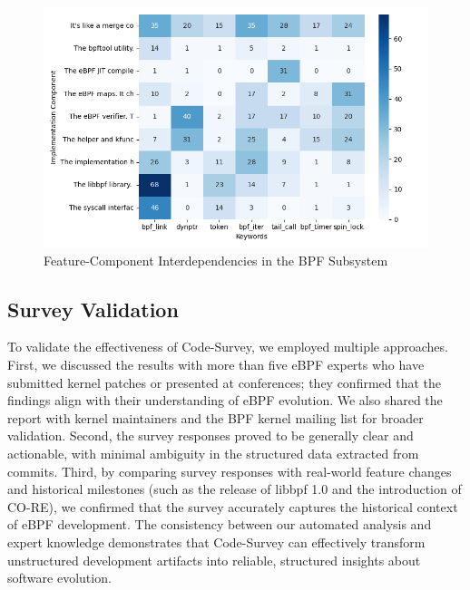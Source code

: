 \begin{figure}[ht]
    \centering
    \includegraphics[width=\linewidth]{feature-analysis/heatmap_bpf_keywords_vs_components.png}
    \caption{Feature-Component Interdependencies in the BPF Subsystem}
    \label{fig:feature_component_heatmap}
\end{figure}


\subsection{Survey Validation}

To validate the effectiveness of Code-Survey, we employed multiple approaches. First, we discussed the results with more than five eBPF experts who have submitted kernel patches or presented at conferences; they confirmed that the findings align with their understanding of eBPF evolution. We also shared the report with kernel maintainers and the BPF kernel mailing list for broader validation. Second, the survey responses proved to be generally clear and actionable, with minimal ambiguity in the structured data extracted from commits. Third, by comparing survey responses with real-world feature changes and historical milestones (such as the release of libbpf 1.0 and the introduction of CO-RE), we confirmed that the survey accurately captures the historical context of eBPF development. The consistency between our automated analysis and expert knowledge demonstrates that Code-Survey can effectively transform unstructured development artifacts into reliable, structured insights about software evolution.

% 
% 